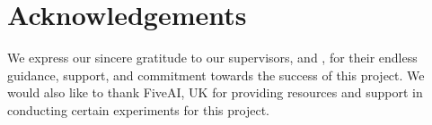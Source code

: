 \chapter*{Acknowledgements}

\vspace{10mm}
We express our sincere gratitude to our supervisors, \guide  and \hod, for their endless guidance, support, and commitment towards the success of this project. We would also like to thank FiveAI, UK for providing resources and support in conducting certain experiments for this project. 

